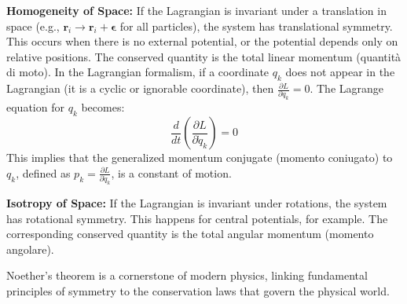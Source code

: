 \textbf{Homogeneity of Space:} If the Lagrangian is invariant under a translation in space (e.g., $\mathbf{r}_i \to \mathbf{r}_i + \boldsymbol{\epsilon}$ for all particles), the system has translational symmetry. This occurs when there is no external potential, or the potential depends only on relative positions. The conserved quantity is the total linear momentum (quantità di moto). In the Lagrangian formalism, if a coordinate $q_k$ does not appear in the Lagrangian (it is a cyclic or ignorable coordinate), then $\frac{\partial L}{\partial q_k} = 0$. The Lagrange equation for $q_k$ becomes:
\[
    \frac{d}{dt}\left(\frac{\partial L}{\partial\dot{q}_k}\right) = 0
\]
This implies that the generalized momentum conjugate (momento coniugato) to $q_k$, defined as $p_k = \frac{\partial L}{\partial\dot{q}_k}$, is a constant of motion.

\textbf{Isotropy of Space:} If the Lagrangian is invariant under rotations, the system has rotational symmetry. This happens for central potentials, for example. The corresponding conserved quantity is the total angular momentum (momento angolare).

Noether's theorem is a cornerstone of modern physics, linking fundamental principles of symmetry to the conservation laws that govern the physical world.
